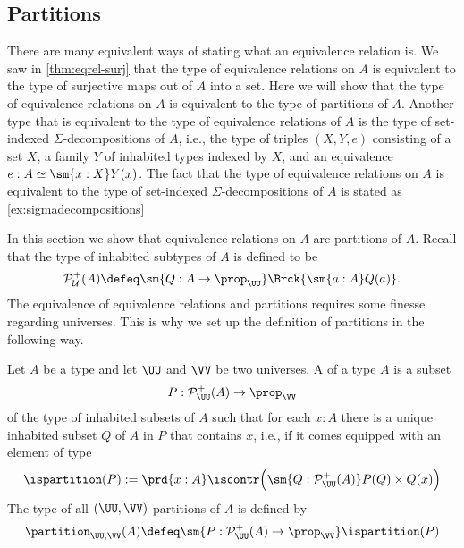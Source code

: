 \subsection{Partitions}

There are many equivalent ways of stating what an equivalence relation is. We saw in \cref{thm:eqrel-surj} that the type of equivalence relations on $A$ is equivalent to the type of surjective maps out of $A$ into a set. Here we will show that the type of equivalence relations on $A$ is equivalent to the type of partitions of $A$. Another type that is equivalent to the type of equivalence relations of $A$ is the type of set-indexed $\Sigma$-decompositions of $A$, i.e., the type of triples $(X,Y,e)$ consisting of a set $X$, a family $Y$ of inhabited types indexed by $X$, and an equivalence $e:A\simeq \sm{x:X}Y(x)$. The fact that the type of equivalence relations on $A$ is equivalent to the type of set-indexed $\Sigma$-decompositions of $A$ is stated as \cref{ex:sigmadecompositions}

In this section we show that equivalence relations on $A$ are partitions of $A$. Recall that the type of inhabited subtypes of $A$ is defined to be
\begin{equation*}
  \mathcal{P}_{\mathcal{U}}^+(A)\defeq\sm{Q:A\to\prop_\UU}\Brck{\sm{a:A}Q(a)}.
\end{equation*}
The equivalence of equivalence relations and partitions requires some finesse regarding universes. This is why we set up the definition of partitions in the following way.

\begin{defn}
  Let $A$ be a type and let $\UU$ and $\VV$ be two universes. A  of a type $A$ is a subset
  \begin{equation*}
    P:\mathcal{P}_{\UU}^+(A)\to\prop_{\VV}
  \end{equation*}
  of the type of inhabited subsets of $A$ such that for each $x:A$ there is a unique inhabited subset $Q$ of $A$ in $P$ that contains $x$, i.e., if it comes equipped with an element of type
  \begin{equation*}
    \ispartition(P):=\prd{x:A}\iscontr\Big(\sm{Q:\mathcal{P}_{\UU}^+(A)}P(Q)\times Q(x)\Big)
  \end{equation*}
  The type of all $(\UU,\VV)$-partitions of $A$ is defined by
  \begin{equation*}
    \partition_{\UU,\VV}(A)\defeq\sm{P:\mathcal{P}_{\UU}^+(A)\to\prop_{\VV}}\ispartition(P)
  \end{equation*}
\end{defn}

